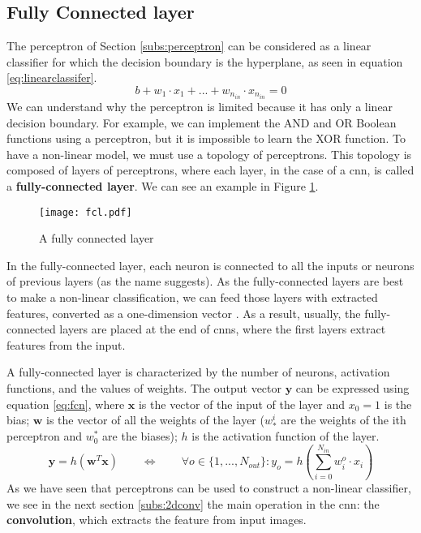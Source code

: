 \subsection{Fully Connected layer} \label{subs:fcl}
The perceptron of Section \ref{subs:perceptron} can be considered as a linear classifier for which the decision boundary is the hyperplane, as seen in equation \eqref{eq:linearclassifer}.
%
\begin{equation}
    b + w_1 \cdot x_1 + ... + w_{n_{in}} \cdot x_{n_{in}} = 0
    \label{eq:linearclassifer}
\end{equation}
%
We can understand why the perceptron is limited because it has only a linear decision boundary. For example, we can implement the AND and OR Boolean functions using a perceptron, but it is impossible to learn the XOR function. To have a non-linear model, we must use a topology of perceptrons. This topology is composed of layers of perceptrons, where each layer, in the case of a \acrshort{cnn}, is called a \textbf{fully-connected layer}. We can see an example in Figure \ref{fig:fcn}.
%
\begin{figure}
    \centering
    \texttt{[image: fcl.pdf]}
    \caption{A fully connected layer}
    \label{fig:fcn}
\end{figure}

In the fully-connected layer, each neuron is connected to all the inputs or neurons of previous layers (as the name suggests). As the fully-connected layers are best to make a non-linear classification, we can feed those layers with extracted features, converted as a one-dimension vector \cite{khan_survey_2020}. As a result, usually, the fully-connected layers are placed at the end of \acrshort{cnn}s, where the first layers extract features from the input.

A fully-connected layer is characterized by the number of neurons, activation functions, and the values of weights. The output vector $\boldsymbol{y}$ can be expressed using equation \eqref{eq:fcn}, where $\boldsymbol{x}$ is the vector of the input of the layer and $x_0 = 1$ is the bias;   $\boldsymbol{w}$ is the vector of all the weights of the layer ($w^i_*$ are the weights of the ith perceptron and $w^*_0$ are the biases); $h$ is the activation function of the layer.
%
\begin{equation}
    \boldsymbol{y} = h(\boldsymbol{w}^T \boldsymbol{x}) \qquad \Leftrightarrow \qquad \forall o \in \{ 1, ..., N_{out} \} : y_o = h(\sum^{N_{in}}_{i=0} w^o_i \cdot x_i)
    \label{eq:fcn}
\end{equation}
%
As we have seen that perceptrons can be used to construct a non-linear classifier, we see in the next section \ref{subs:2dconv} the main operation in the \acrshort{cnn}: the \textbf{convolution}, which extracts the feature from input images.
